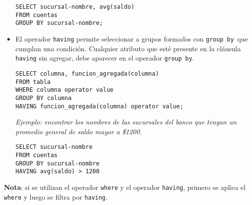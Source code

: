 \documentclass[a4paper, twoside]{article}
\begin{document}
\begin{itemize}
	\begin{lstlisting}
SELECT sucursal-nombre, avg(saldo)
FROM cuentas
GROUP BY sucursal-nombre;
	\end{lstlisting}
	\item El operador \texttt{having} permite seleccionar a grupos formados con \texttt{group by }que cumplan una condición. Cualquier atributo que esté presente en la cláusula \texttt{having} sin agregar, debe aparecer en el operador \texttt{group by}.
	\begin{lstlisting}
SELECT columna, funcion_agregada(columna) 
FROM tabla 
WHERE columna operator value 
GROUP BY columna
HAVING funcion_agregada(columna) operator value;
	\end{lstlisting}
	\emph{Ejemplo: encontrar los nombres de las sucursales del banco que tengan un promedio general de saldo mayor a \$1200.}
	\begin{lstlisting}
SELECT sucursal-nombre
FROM cuentas
GROUP BY sucursal-nombre
HAVING avg(saldo) > 1200
	\end{lstlisting}
\end{itemize}

\textbf{Nota}: si se utilizan el operador \texttt{where} y el operador \texttt{having}, primero se aplica el \texttt{where} y luego se filtra por \texttt{having}.
\end{document}
